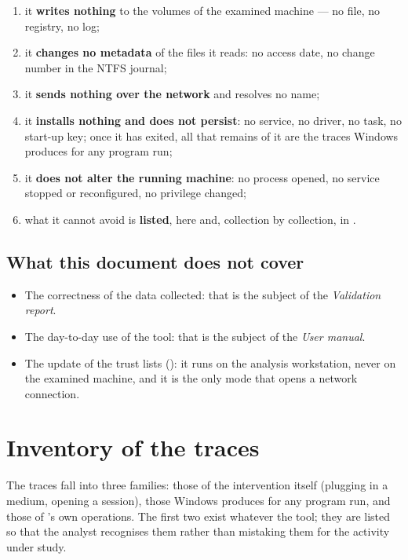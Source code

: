 \documentclass[11pt,a4paper,oneside]{report}
\begin{document}
\begin{enumerate}
  \item it \textbf{writes nothing} to the volumes of the examined machine —
        no file, no registry, no log;
  \item it \textbf{changes no metadata} of the files it reads: no access
        date, no change number in the NTFS journal;
  \item it \textbf{sends nothing over the network} and resolves no name;
  \item it \textbf{installs nothing and does not persist}: no service, no
        driver, no task, no start-up key; once it has exited, all that remains
        of it are the traces Windows produces for any program run;
  \item it \textbf{does not alter the running machine}: no process opened, no
        service stopped or reconfigured, no privilege changed;
  \item what it cannot avoid is \textbf{listed}, here and, collection by
        collection, in .
\end{enumerate}

\section{What this document does not cover}

\begin{itemize}
  \item The correctness of the data collected: that is the subject of the
        \emph{Validation report}.
  \item The day-to-day use of the tool: that is the subject of the \emph{User
        manual}.
  \item The update of the trust lists (): it runs on the
        analysis workstation, never on the examined machine, and it is the
        only mode that opens a network connection.
\end{itemize}

\chapter{Inventory of the traces}\label{ch:traces}

The traces fall into three families: those of the intervention itself
(plugging in a medium, opening a session), those Windows produces for any
program run, and those of \wac{}'s own operations. The first two exist
whatever the tool; they are listed so that the analyst recognises them rather
than mistaking them for the activity under study.
\end{document}
